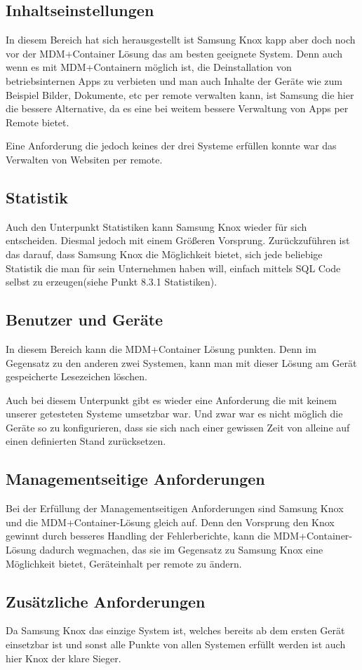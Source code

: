 \subsection{Inhaltseinstellungen}
In diesem Bereich hat sich herausgestellt ist Samsung Knox kapp aber doch noch vor der MDM+Container Lösung das am besten geeignete System. Denn auch wenn es mit MDM+Containern möglich ist, die Deinstallation von betriebsinternen Apps zu verbieten und man auch Inhalte der Geräte wie zum Beispiel Bilder, Dokumente, etc per remote verwalten kann, ist Samsung die hier die bessere Alternative, da es eine bei weitem bessere Verwaltung von Apps per Remote bietet. \par
Eine Anforderung die jedoch keines der drei Systeme erfüllen konnte war das Verwalten von Websiten per remote.
\subsection{Statistik}
Auch den Unterpunkt Statistiken kann Samsung Knox wieder für sich entscheiden. Diesmal jedoch mit einem Größeren Vorsprung. Zurückzuführen ist das darauf, dass Samsung Knox die Möglichkeit bietet, sich jede beliebige Statistik die man für sein Unternehmen haben will, einfach mittels SQL Code selbst zu erzeugen(siehe Punkt 8.3.1 Statistiken).
\subsection{Benutzer und Geräte}
In diesem Bereich kann die MDM+Container Lösung punkten. Denn im Gegensatz zu den anderen zwei Systemen, kann man mit dieser Lösung am Gerät gespeicherte Lesezeichen löschen. \par
Auch bei diesem Unterpunkt gibt es wieder eine Anforderung die mit keinem unserer getesteten Systeme umsetzbar war. Und zwar war es nicht möglich die Geräte so zu konfigurieren, dass sie sich nach einer gewissen Zeit von alleine auf einen definierten Stand zurücksetzen.
\subsection{Managementseitige Anforderungen}
Bei der Erfüllung der Managementseitigen Anforderungen sind Samsung Knox und die MDM+Container-Lösung gleich auf. Denn den Vorsprung den Knox gewinnt durch besseres Handling der Fehlerberichte, kann die MDM+Container-Lösung dadurch wegmachen, das sie im Gegensatz zu Samsung Knox eine Möglichkeit bietet, Geräteinhalt per remote zu ändern.
\subsection{Zusätzliche Anforderungen}
Da Samsung Knox das einzige System ist, welches bereits ab dem ersten Gerät einsetzbar ist und sonst alle Punkte von allen Systemen erfüllt werden ist auch hier Knox der klare Sieger.

